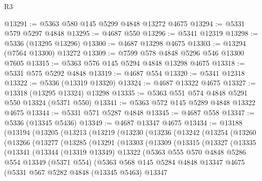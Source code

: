 \begin{lexlean}{R3}
\begin{coremodule}
@13291 := @5363 @580 @145 @5299 @4848 @13272 @4675
@13294 := @5331 @579 @5297 @4848
@13295 := @4687 @550
@13296 := @5341 @12319
@13298 := @5336 (@13295 @13296)
@13300 := @4687 @13298 @4675
@13303 := @13294 (@7564 @13300) @13272
@13309 := @7599 @578 @4848 @5296 @546 @13300 @7605
@13315 := @5363 @576 @145 @5294 @4848 @13298 @4675
@13318 := @5331 @575 @5292 @4848
@13319 := @4687 @554
@13320 := @5341 @12318
@13322 := @5336 (@13319 @13320)
@13324 := @4687 @13322 @4675
@13327 := @13318 (@13295 @13324) @13298
@13335 := @5363 @551 @574 @4848 @5291 @550 @13324 (@5371 @550)
@13341 := @5363 @572 @145 @5289 @4848 @13322 @4675
@13344 := @5331 @571 @5287 @4848
@13345 := @4687 @558
@13347 := @5336 (@13345 @5436)
@13349 := @4687 @13347 @4675
@13434 := @13188
    (@13194
      (@13205
        (@13213
          (@13219
            (@13230
              (@13236
                (@13242
                  (@13254
                    (@13260
                      (@13266
                        (@13277
                          (@13285
                            (@13291
                              (@13303
                                (@13309
                                  (@13315
                                    (@13327
                                      (@13335
                                        (@13341
                                          (@13344
                                            (@13319 @13349)
                                            @13322
                                            (@5363
                                              @555
                                              @570
                                              @4848
                                              @5286
                                              @554
                                              @13349
                                              (@5371 @554)
                                              (@5363
                                                @568
                                                @145
                                                @5284
                                                @4848
                                                @13347
                                                @4675
                                                (@5331
                                                  @567
                                                  @5282
                                                  @4848
                                                  (@13345 @5463)
                                                  @13347

\end{coremodule}
\end{lexlean}
